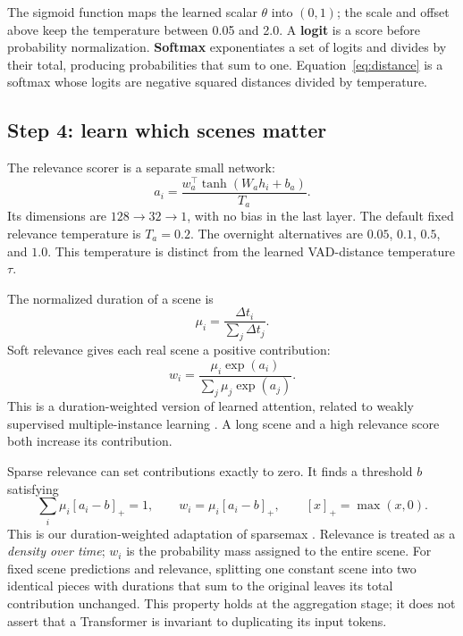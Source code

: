 \documentclass[11pt,a4paper]{article}
\begin{document}
The sigmoid function maps the learned scalar $\theta$ into $(0,1)$; the scale and offset above keep the temperature between 0.05 and 2.0. A \textbf{logit} is a score before probability normalization. \textbf{Softmax} exponentiates a set of logits and divides by their total, producing probabilities that sum to one. Equation~\ref{eq:distance} is a softmax whose logits are negative squared distances divided by temperature.

\subsection{Step 4: learn which scenes matter}
The relevance scorer is a separate small network:
\begin{equation}
a_i=\frac{w_a^\top\tanh(W_ah_i+b_a)}{T_a}.
\end{equation}
Its dimensions are $128\rightarrow32\rightarrow1$, with no bias in the last layer. The default fixed relevance temperature is $T_a=0.2$. The overnight alternatives are $0.05$, $0.1$, $0.5$, and $1.0$. This temperature is distinct from the learned VAD-distance temperature $\tau$.

The normalized duration of a scene is
\begin{equation}
\mu_i=\frac{\Delta t_i}{\sum_j\Delta t_j}.
\end{equation}
Soft relevance gives each real scene a positive contribution:
\begin{equation}
w_i=\frac{\mu_i\exp(a_i)}{\sum_j\mu_j\exp(a_j)}.
\end{equation}
This is a duration-weighted version of learned attention, related to weakly supervised multiple-instance learning \cite{mil}. A long scene and a high relevance score both increase its contribution.

Sparse relevance can set contributions exactly to zero. It finds a threshold $b$ satisfying
\begin{equation}
\sum_i\mu_i[a_i-b]_+=1,\qquad
w_i=\mu_i[a_i-b]_+,\qquad [x]_+=\max(x,0).
\label{eq:sparse}
\end{equation}
This is our duration-weighted adaptation of sparsemax \cite{sparsemax}. Relevance is treated as a \emph{density over time}; $w_i$ is the probability mass assigned to the entire scene. For fixed scene predictions and relevance, splitting one constant scene into two identical pieces with durations that sum to the original leaves its total contribution unchanged. This property holds at the aggregation stage; it does not assert that a Transformer is invariant to duplicating its input tokens.
\end{document}

